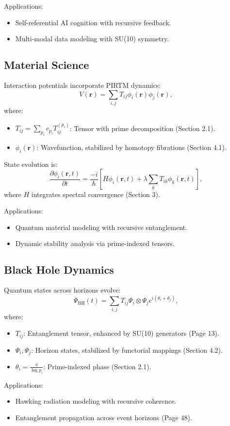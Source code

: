\documentclass{article}
\theoremstyle{plain}
\begin{document}
Applications:
\begin{itemize}
    \item Self-referential AI cognition with recursive feedback.
    \item Multi-modal data modeling with SU(10) symmetry.
\end{itemize}

\subsection{Material Science}

Interaction potentials incorporate PIRTM dynamics:
\begin{equation}
V(\mathbf{r}) = \sum_{i,j} T_{ij} \phi_i(\mathbf{r}) \phi_j(\mathbf{r}),
\end{equation}
where:
\begin{itemize}
    \item \( T_{ij} = \sum_{p_i} c_{p_i} T_{ij}^{(p_i)} \): Tensor with prime decomposition (Section 2.1).
    \item \( \phi_i(\mathbf{r}) \): Wavefunction, stabilized by homotopy fibrations (Section 4.1).
\end{itemize}
State evolution is:
\begin{equation}
\frac{\partial \phi_i(\mathbf{r}, t)}{\partial t} = \frac{-i}{\hbar} \left[ H \phi_i(\mathbf{r}, t) + \lambda \sum_{k} T_{ik} \phi_k(\mathbf{r}, t) \right],
\end{equation}
where \( H \) integrates spectral convergence (Section 3).

Applications:
\begin{itemize}
    \item Quantum material modeling with recursive entanglement.
    \item Dynamic stability analysis via prime-indexed tensors.
\end{itemize}

\subsection{Black Hole Dynamics}

Quantum states across horizons evolve:
\begin{equation}
\Psi_{\text{BH}}(t) = \sum_{i,j} T_{ij} \Psi_i \otimes \Psi_j e^{i (\theta_i + \theta_j)},
\end{equation}
where:
\begin{itemize}
    \item \( T_{ij} \): Entanglement tensor, enhanced by SU(10) generators (Page 13).
    \item \( \Psi_i, \Psi_j \): Horizon states, stabilized by functorial mappings (Section 4.2).
    \item \( \theta_i = \frac{\pi}{\log p_i} \): Prime-indexed phase (Section 2.1).
\end{itemize}
Applications:
\begin{itemize}
    \item Hawking radiation modeling with recursive coherence.
    \item Entanglement propagation across event horizons (Page 48).
\end{itemize}
\end{document}
